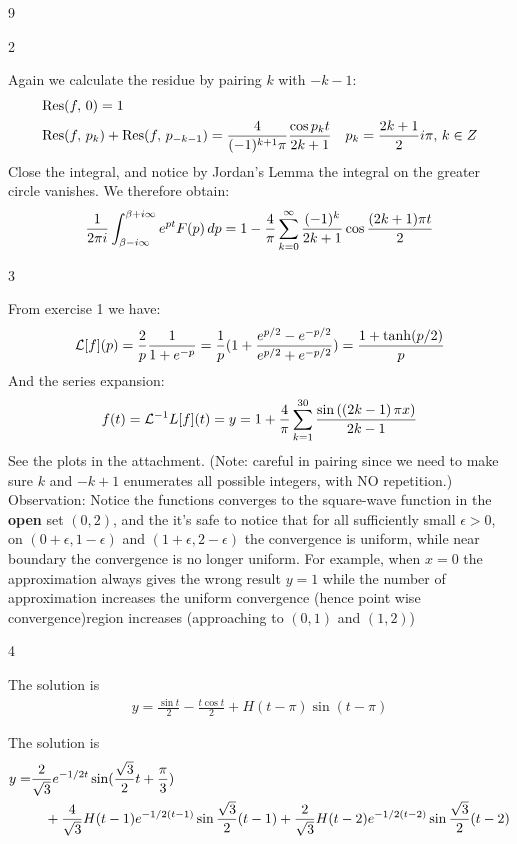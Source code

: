 \begin{vv286}{9}
\begin{vv286_mp}{2}
 \item[(ii)]
   Again we calculate the residue by pairing $k$ with $-k-1$:
   \begin{align*}
     &\hbox{$\mathop{\rm Res}(f,\,0)$}=1\\
     &\hbox{$\mathop{\rm Res}(f,\,p_k)$}+\hbox{$\mathop{\rm Res}(f,\,p_{-k-1})$}=\frac{4}{(-1)^{k+1}\pi}\frac{\cos p_kt}{2k+1}\quad
     p_k=\frac{2k+1}{2}i\pi, \, k\in Z
   \end{align*}
    Close the integral, and notice by Jordan's Lemma the integral on the
   greater circle vanishes. We therefore obtain:
 \begin{align*}
     \frac{1}{2\pi i}\int_{\beta-i\infty}^{\beta+i\infty}e^{pt}F(p)\, dp=
     1-\frac{4}{\pi}\sum_{k=0}^{\infty}\frac{(-1)^k}{2k+1}\cos \frac{(2k+1)\pi t}{2}
   \end{align*}
  \end{vv286_mp}
  \begin{vv286_ms}{3}
  \item[]
    From exercise 1 we have:
    \begin{align*}
      \mathcal{L}[f](p)=\frac{2}{p}\frac{1}{1+e^{-p}}=\frac{1}{p}(1+\frac{e^{p/2}-e^{-p/2}}{e^{p/2}+e^{-p/2}})=\frac{1+\tanh(p/2)}{p}
    \end{align*}
    And the series expansion:
   \begin{align*}
     f(t)=\mathcal{L}^{-1}L[f](t)=y=1+\frac{4}{\pi }\sum_{k=1}^{30}{\frac{\sin \left( \left( 2k-1 \right)\pi x \right)}{2k-1}}
   \end{align*}
   See the plots in the attachment.
   (Note: careful in pairing since we need to make sure $k$ and
   $-k+1$ enumerates all possible integers, with NO repetition.)\\
   Observation:
Notice the functions converges to the square-wave function in the {\bf open} set $(0,2)$, and the it's safe to notice that for all sufficiently small $\epsilon>0$, on $(0+\epsilon,  1-\epsilon)$ and $(1+\epsilon,  2-\epsilon)$ the convergence is uniform, while near boundary the convergence is no longer uniform. For example, when $x=0$ the approximation always gives the wrong result $y=1$ while the number of approximation increases the uniform convergence (hence point wise convergence)region increases (approaching to $(0,1)$ and $(1,2)$)

  \end{vv286_ms}
  \begin{vv286_ms}{4}
  \item[(i)]
    The solution is
    \begin{align*}
      y=\frac{\sin t}{2}-\frac{t\cos t}{2}+H(t-\pi)\sin (t-\pi)
    \end{align*}
   \item[(ii)]
     The solution is
     \begin{align*}
       y=&\frac{2}{\sqrt{3}}e^{-1/2t}\sin (\frac{\sqrt{3}}{2}t+\frac{\pi}{3})\\
       &\quad+\frac{4}{\sqrt{3}}H(t-1)e^{-1/2(t-1)}\sin \frac{\sqrt{3}}{2}(t-1)+
       \frac{2}{\sqrt{3}}H(t-2)e^{-1/2(t-2)}\sin \frac{\sqrt{3}}{2}(t-2)
     \end{align*}
  \end{vv286_ms}


\end{vv286}
